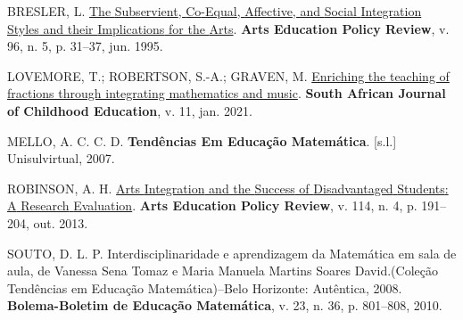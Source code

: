 \documentclass[
  letterpaper,
  DIV=11,
  numbers=noendperiod]{scrreprt}
\newlength{\cslhangindent}
\newenvironment{CSLReferences}[2] %
 {\begin{list}{}{%
  \setlength{\itemindent}{0pt}
  \setlength{\leftmargin}{0pt}
  \setlength{\parsep}{0pt}
  \ifodd #1
   \setlength{\leftmargin}{\cslhangindent}
   \setlength{\itemindent}{-1\cslhangindent}
  \fi
  \setlength{\itemsep}{#2\baselineskip}}}
 {\end{list}}
\begin{document}
\label{refs}
\begin{CSLReferences}{0}{1}
BRESLER, L. \href{https://doi.org/10.1080/10632913.1995.9934564}{The
{Subservient}, {Co}-{Equal}, {Affective}, and {Social} {Integration}
{Styles} and their {Implications} for the {Arts}}. \textbf{Arts
Education Policy Review}, v. 96, n. 5, p. 31--37, jun. 1995.

LOVEMORE, T.; ROBERTSON, S.-A.; GRAVEN, M.
\href{https://doi.org/10.4102/sajce.v11i1.899}{Enriching the teaching of
fractions through integrating mathematics and music}. \textbf{South
African Journal of Childhood Education}, v. 11, jan. 2021.

MELLO, A. C. C. D. \textbf{Tendências {Em} {Educação} {Matemática}}.
{[}s.l.{]} Unisulvirtual, 2007.

ROBINSON, A. H. \href{https://doi.org/10.1080/10632913.2013.826050}{Arts
{Integration} and the {Success} of {Disadvantaged} {Students}: {A}
{Research} {Evaluation}}. \textbf{Arts Education Policy Review}, v. 114,
n. 4, p. 191--204, out. 2013.

SOUTO, D. L. P. Interdisciplinaridade e aprendizagem da {Matemática} em
sala de aula, de {Vanessa} {Sena} {Tomaz} e {Maria} {Manuela} {Martins}
{Soares} {David}.({Coleção} {Tendências} em {Educação}
{Matemática})--{Belo} {Horizonte}: {Autêntica}, 2008.
\textbf{Bolema-Boletim de Educação Matemática}, v. 23, n. 36, p.
801--808, 2010.

\end{CSLReferences}
\end{document}
